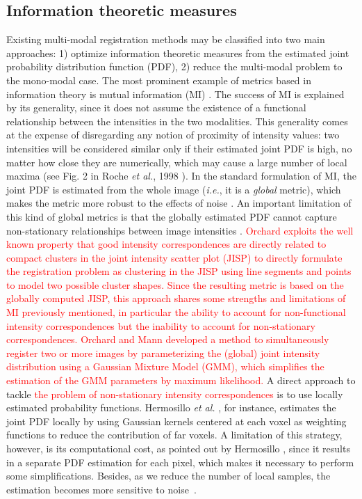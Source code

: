\subsection{Information theoretic measures}
Existing multi-modal registration methods may be classified into two main approaches: 1) optimize information theoretic measures from the estimated joint probability distribution function (PDF), 2) reduce the multi-modal problem to the mono-modal case. The most prominent example of metrics based in information theory is mutual information (MI) \cite{Maes1997, Mattes2003}. The success of MI is explained by its generality, since it does not assume the existence of a functional relationship between the intensities in the two modalities. This generality comes at the expense of disregarding any notion of proximity of intensity values: two intensities will be considered similar only if their estimated joint PDF is high, no matter how close they are numerically, which may cause a large number of local maxima (see Fig. 2 in Roche {\it et al.}, 1998 \cite{Roche1998}). In the standard formulation of MI, the joint PDF is estimated from the whole image ({\it i.e.}, it is a {\it global} metric), which makes the metric more robust to the effects of noise \cite{Mattes2003}. An important limitation of this kind of global metrics is that the globally estimated PDF cannot capture non-stationary relationships between image intensities \cite{Hermosillo2004}. \textcolor{red}{Orchard \cite{Orchard2008} exploits the well known property \cite{Hermosillo2004} that good intensity correspondences are directly related to compact clusters in the joint intensity scatter plot (JISP)
to directly formulate the registration problem as clustering in the JISP using line segments and points to model two possible cluster shapes. Since the resulting metric is based on the globally computed JISP, this approach shares some strengths and limitations of MI previously mentioned, in particular the ability to account for non-functional intensity correspondences but the inability to account for non-stationary correspondences. Orchard and Mann \cite{Orchard2010} developed a method to simultaneously register two or more images by parameterizing the (global) joint intensity distribution using a Gaussian Mixture Model (GMM), which simplifies the estimation of the GMM parameters by maximum likelihood.} A direct approach to tackle \textcolor{red}{the problem of non-stationary intensity correspondences} is to use locally estimated probability functions. Hermosillo {\it et al.} \cite{Hermosillo2004}, for instance, estimates the joint PDF locally by using Gaussian kernels centered at each voxel as weighting functions to reduce the contribution of far voxels. A limitation of this strategy, however, is its computational cost, as pointed out by Hermosillo \cite{Hermosillo2004}, since it results in a separate PDF estimation for each pixel, which makes it necessary to perform some simplifications. Besides, as we reduce the number of local samples, the estimation becomes more sensitive to noise~\cite{Mattes2003}.

